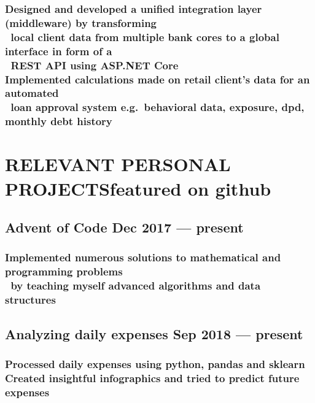 \documentclass{article}
\begin{document}
\subsubsection{Designed and developed a unified integration layer (middleware) by transforming
  \\\-\ \quad local client data from multiple bank cores to a global interface in form of a
  \\\-\ \quad REST API using ASP.NET Core
  \\Implemented calculations made on retail client's data for an automated
  \\\-\ \quad loan approval system e.g.\ behavioral data, exposure, dpd, monthly debt history}

\section{RELEVANT PERSONAL PROJECTS\hfill featured on github}
\subsection{Advent of Code \hfill Dec 2017 --- present}
\subsubsection{Implemented numerous solutions to mathematical and programming problems
  \\\-\ \quad by teaching myself advanced algorithms and data structures}
\subsection{Analyzing daily expenses \hfill Sep 2018 --- present}
\subsubsection{Processed daily expenses using python, pandas and sklearn
  \\Created insightful infographics and tried to predict future expenses}
\end{document}
